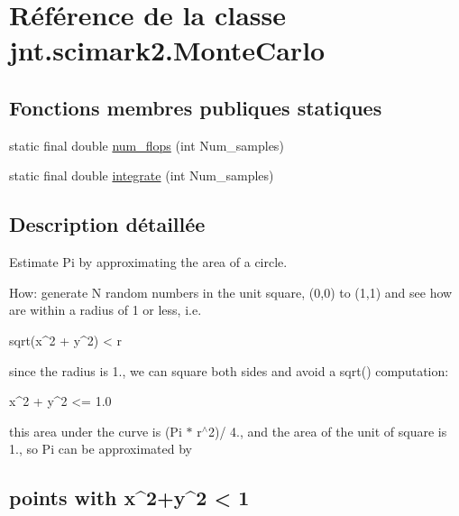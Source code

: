 \hypertarget{classjnt_1_1scimark2_1_1MonteCarlo}{\section{Référence de la classe jnt.\-scimark2.\-Monte\-Carlo}
\label{classjnt_1_1scimark2_1_1MonteCarlo}
}
\subsection*{Fonctions membres publiques statiques}
\begin{DoxyCompactItemize}
\item 
static final double \hyperlink{classjnt_1_1scimark2_1_1MonteCarlo_a09e904b46a3b8fcb01a6e5d3270e0d98}{num\-\_\-flops} (int Num\-\_\-samples)
\item 
static final double \hyperlink{classjnt_1_1scimark2_1_1MonteCarlo_a925ca34283007150647ea238b382b6e9}{integrate} (int Num\-\_\-samples)
\end{DoxyCompactItemize}


\subsection{Description détaillée}
Estimate Pi by approximating the area of a circle.

How\-: generate N random numbers in the unit square, (0,0) to (1,1) and see how are within a radius of 1 or less, i.\-e. 
\begin{DoxyPre}\end{DoxyPre}



\begin{DoxyPre}sqrt(x^2 + y^2) < r\end{DoxyPre}



\begin{DoxyPre}\end{DoxyPre}
 since the radius is 1., we can square both sides and avoid a sqrt() computation\-: 
\begin{DoxyPre}\end{DoxyPre}



\begin{DoxyPre}   x^2 + y^2 <= 1.0\end{DoxyPre}



\begin{DoxyPre} \end{DoxyPre}
 this area under the curve is (Pi $\ast$ r$^\wedge$2)/ 4., and the area of the unit of square is 1., so Pi can be approximated by 
\begin{DoxyPre}
\subsection*{points with x^2+y^2 < 1}\end{DoxyPre}



